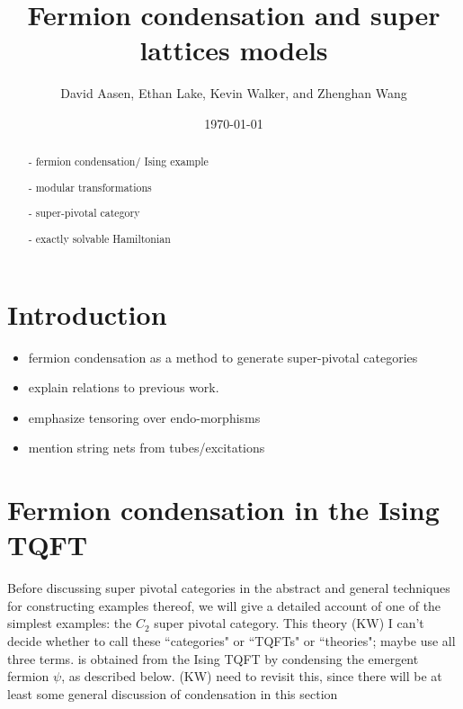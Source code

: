 \documentclass[12pt,a4paper]{article}
\newcommand{\kw}[1]{{\color{kwcolor}\footnotesize{(KW) #1}}}
\begin{document}
\title{Fermion condensation and super lattices models}
\author{David Aasen, Ethan Lake, Kevin Walker, and Zhenghan Wang}

\date{\today}

\maketitle

\begin{abstract}
- fermion condensation/ Ising example

- modular transformations

- super-pivotal category

- exactly solvable Hamiltonian
\end{abstract}

\tableofcontents




\section{Introduction}

\begin{itemize}
\item fermion condensation as a method to generate super-pivotal categories
\item explain relations to previous work. 
\item emphasize tensoring over endo-morphisms
\item mention string nets from tubes/excitations
\end{itemize}




\section{Fermion condensation in the Ising TQFT}

Before discussing super pivotal categories in the abstract and general techniques for constructing examples thereof,
we will give a detailed account of one of the simplest examples:
the $C_2$ super pivotal category.
This theory 
\kw{I can't decide whether to call these ``categories" or ``TQFTs" or ``theories"; maybe use all three terms.}
is obtained from the Ising TQFT by condensing the emergent fermion $\psi$, as described below.
\kw{need to revisit this, since there will be at least some general discussion of condensation in this section}
\end{document}
